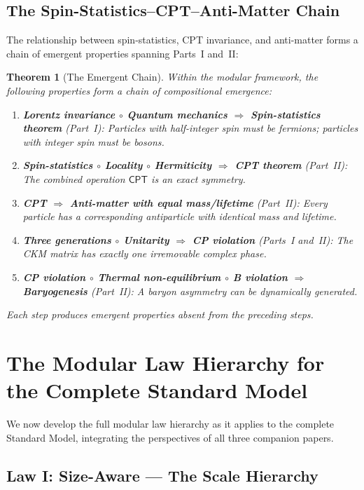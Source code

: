\documentclass[12pt]{article}
\newtheorem{theorem}{Theorem}[section]
\theoremstyle{definition}
\theoremstyle{remark}
\newcommand{\CPT}{\mathsf{CPT}}
\begin{document}
\subsection{The Spin-Statistics--CPT--Anti-Matter Chain}

The relationship between spin-statistics, CPT invariance, and anti-matter forms a chain of emergent properties spanning Parts~I and~II:

\begin{theorem}[The Emergent Chain]
\label{thm:emergent-chain}
Within the modular framework, the following properties form a chain of compositional emergence:
\begin{enumerate}
\item \textbf{Lorentz invariance $\circ$ Quantum mechanics $\Rightarrow$ Spin-statistics theorem} (Part~I): Particles with half-integer spin must be fermions; particles with integer spin must be bosons.
\item \textbf{Spin-statistics $\circ$ Locality $\circ$ Hermiticity $\Rightarrow$ CPT theorem} (Part~II): The combined operation $\CPT$ is an exact symmetry.
\item \textbf{CPT $\Rightarrow$ Anti-matter with equal mass/lifetime} (Part~II): Every particle has a corresponding antiparticle with identical mass and lifetime.
\item \textbf{Three generations $\circ$ Unitarity $\Rightarrow$ CP violation} (Parts~I and~II): The CKM matrix has exactly one irremovable complex phase.
\item \textbf{CP violation $\circ$ Thermal non-equilibrium $\circ$ B violation $\Rightarrow$ Baryogenesis} (Part~II): A baryon asymmetry can be dynamically generated.
\end{enumerate}
Each step produces emergent properties absent from the preceding steps.
\end{theorem}


\section{The Modular Law Hierarchy for the Complete Standard Model}
\label{sec:modular-hierarchy}

We now develop the full modular law hierarchy as it applies to the complete Standard Model, integrating the perspectives of all three companion papers.

\subsection{Law I: Size-Aware --- The Scale Hierarchy}
\end{document}
